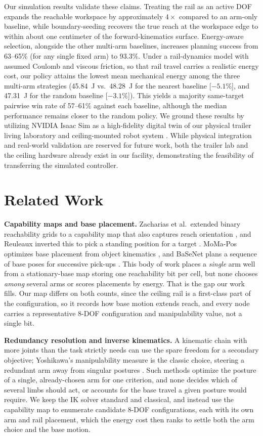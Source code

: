 \documentclass[conference]{IEEEtran}
\begin{document}
Our simulation results validate these claims. Treating the rail as an active DOF 
expands the reachable workspace by approximately $4\times$ compared to an arm-only 
baseline, while boundary-seeding recovers the true reach at the workspace edge to 
within about one centimeter of the forward-kinematics surface. Energy-aware selection, 
alongside the other multi-arm baselines, increases planning success from 63--65\% 
(for any single fixed arm) to 93.3\%. Under a rail-dynamics model with assumed 
Coulomb and viscous friction, so that rail travel carries a realistic energy cost, our
policy attains the lowest mean mechanical energy among the three multi-arm strategies 
(45.84~J vs.\ 48.28~J for the nearest baseline [$-5.1\%$], and 47.31~J for the random 
baseline [$-3.1\%$]). This yields a majority same-target pairwise win rate of 57--61\% 
against each baseline, although the median performance remains closer to the random policy. 
We ground these results by utilizing NVIDIA Isaac Sim \cite{IsaacSim2026} as a 
high-fidelity digital twin of our physical trailer living laboratory and ceiling-mounted 
robot system \cite{Kubota2022}. While physical integration and real-world validation 
are reserved for future work, both the trailer lab and the ceiling hardware already 
exist in our facility, demonstrating the feasibility of transferring the simulated controller.

\section{Related Work}

\noindent\textbf{Capability maps and base placement.}
Zacharias et al.\ extended binary reachability grids to a
capability map that also captures reach orientation \cite{Zacharias2007}, and
Reuleaux inverted this to pick a standing position for a target
\cite{Makhal2018}. MoMa-Pos optimizes base placement from object kinematics
\cite{MoMaPos2024}, and BaSeNet plans a sequence of base poses for successive
pick-ups \cite{BaSeNet2024}. This body of work places a \emph{single} arm well
from a stationary-base map storing one reachability bit per cell, but none
chooses \emph{among} several arms or scores placements by energy. That is the gap our
work fills. Our map differs on both counts, since the ceiling rail is a first-class
part of the configuration, so it records how base motion extends reach, and
every node carries a representative 8-DOF configuration and manipulability
value, not a single bit.

\noindent\textbf{Redundancy resolution and inverse kinematics.}
A kinematic chain with more joints than the task strictly needs can use
the spare freedom for a secondary objective; Yoshikawa's manipulability measure is
the classic choice, steering a redundant arm away from singular postures
\cite{Yoshikawa1985}. Such methods optimize the posture of a single, already-chosen
arm for one criterion, and none decides which of several limbs should act, or accounts
for the base travel a given posture would require. We keep the IK solver standard and
classical, and instead use the capability map to enumerate candidate 8-DOF
configurations, each with its own arm and rail placement, which the energy cost then
ranks to settle both the arm choice and the base motion.
\end{document}
